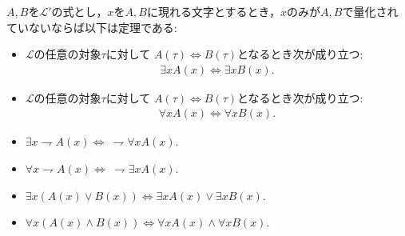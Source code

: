 	\begin{screen}
		\begin{metathm}
			$A,B$を$\mathcal{L}'$の式とし，$x$を$A,B$に現れる文字とするとき，$x$のみが$A,B$で量化されていないならば以下は定理である:
			\begin{itemize}
				\item $\mathcal{L}$の任意の対象$\tau$に対して
					$A(\tau) \Longleftrightarrow B(\tau)$となるとき次が成り立つ:
					\begin{align}
						\exists x A(x) \Longleftrightarrow \exists x B(x).
					\end{align}
				
				\item $\mathcal{L}$の任意の対象$\tau$に対して
					$A(\tau) \Longleftrightarrow B(\tau)$となるとき次が成り立つ:
					\begin{align}
						\forall x A(x) \Longleftrightarrow \forall x B(x).
					\end{align}
					
				\item $\exists x \rightharpoondown A(x) \Longleftrightarrow\ \rightharpoondown \forall x A(x)$.
				
				\item $\forall x \rightharpoondown A(x) \Longleftrightarrow\ \rightharpoondown \exists x A(x)$.
				
				\item $\exists x ( A(x) \vee B(x) ) \Longleftrightarrow \exists x A(x) \vee \exists x B(x)$.
				
				\item $\forall x ( A(x) \wedge B(x) ) \Longleftrightarrow \forall x A(x) \wedge \forall x B(x)$.
			\end{itemize}
		\end{metathm}
	\end{screen}
	
